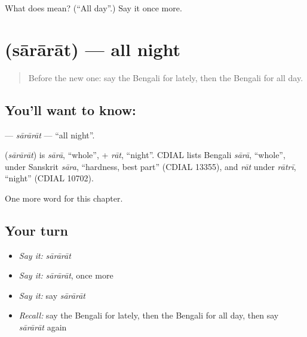 \begin{tcolorbox}[breakable,colback=teal!4,colframe=teal!35!black,title={Before you move on}]
What does  mean? (\textquotedblleft{}All day\textquotedblright{}.) Say it once more.
\end{tcolorbox}
\section[\texorpdfstring{\bn{সারারাত} (sārārāt)}{সারারাত (sārārāt)}]{ (sārārāt) — all night}

\label{lesson:BN-C95-sararat}



\begin{quote}
Before the new one: say the Bengali for lately, then the Bengali for all day.
\end{quote}

\subsection*{You'll want to know: }
\textbf{} — \emph{sārārāt} — \textquotedblleft{}all night\textquotedblright{}.

\begin{cousinweb}
\textbf{} (\emph{sārārāt}) is \emph{sārā}, \textquotedblleft{}whole\textquotedblright{}, + \emph{rāt}, \textquotedblleft{}night\textquotedblright{}. CDIAL lists Bengali \emph{sārā}, \textquotedblleft{}whole\textquotedblright{}, under Sanskrit \emph{sāra}, \textquotedblleft{}hardness, best part\textquotedblright{} (CDIAL 13355), and \emph{rāt} under \emph{rātrī}, \textquotedblleft{}night\textquotedblright{} (CDIAL 10702).
\end{cousinweb}

\begin{grammarlens}[title={What you've built}]
One more word for this chapter.
\end{grammarlens}

\subsection*{Your turn}
\begin{itemize}
\raggedright
  \item \emph{Say it:} \emph{sārārāt}
  \item \emph{Say it:} \emph{sārārāt}, once more
  \item \emph{Say it:} say \emph{sārārāt}
  \item \emph{Recall:} say the Bengali for lately, then the Bengali for all day, then say \emph{sārārāt} again
\end{itemize}

